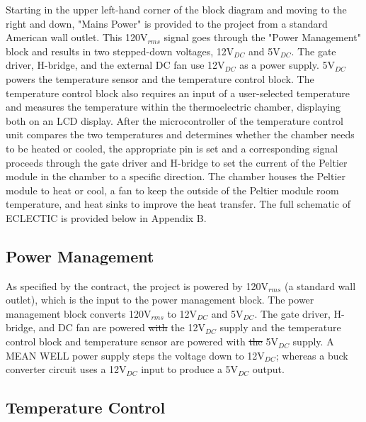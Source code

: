 \documentclass[11pt,letter]{article}
\providecommand{\DIFadd}[1]{{\protect\color{blue}\uwave{#1}}} %
\providecommand{\DIFdel}[1]{{\protect\color{red}\sout{#1}}}                      %
\providecommand{\DIFaddbegin}{} %
\providecommand{\DIFaddend}{} %
\providecommand{\DIFdelbegin}{} %
\providecommand{\DIFdelend}{} %
\newcommand{\DIFscaledelfig}{0.5}
\newlength{\DIFdelgraphicswidth} %
\newlength{\DIFdelgraphicsheight} %
\newcommand{\DIFaddincludegraphics}[2][]{{\color{blue}\fbox{\DIFOincludegraphics[#1]{#2}}}} %
\newcommand{\DIFdelincludegraphics}[2][]{%
\sbox{\DIFdelgraphicsbox}{\DIFOincludegraphics[#1]{#2}}%
\settoboxwidth{\DIFdelgraphicswidth}{\DIFdelgraphicsbox} %
\settoboxtotalheight{\DIFdelgraphicsheight}{\DIFdelgraphicsbox} %
\scalebox{\DIFscaledelfig}{%
\parbox[b]{\DIFdelgraphicswidth}{\usebox{\DIFdelgraphicsbox}\\[-\baselineskip] \rule{\DIFdelgraphicswidth}{0em}}\llap{\resizebox{\DIFdelgraphicswidth}{\DIFdelgraphicsheight}{%
\setlength{\unitlength}{\DIFdelgraphicswidth}%
\begin{picture}(1,1)%
\thicklines\linethickness{2pt} %
{\color[rgb]{1,0,0}\put(0,0){\framebox(1,1){}}}%
{\color[rgb]{1,0,0}\put(0,0){\line( 1,1){1}}}%
{\color[rgb]{1,0,0}\put(0,1){\line(1,-1){1}}}%
\end{picture}%
}\hspace*{3pt}}} %
} %
\DeclareRobustCommand{\DIFaddbegin}{\DIFOaddbegin \let\includegraphics\DIFaddincludegraphics} %
\DeclareRobustCommand{\DIFaddend}{\DIFOaddend \let\includegraphics\DIFOincludegraphics} %
\DeclareRobustCommand{\DIFdelbegin}{\DIFOdelbegin \let\includegraphics\DIFdelincludegraphics} %
\DeclareRobustCommand{\DIFdelend}{\DIFOaddend \let\includegraphics\DIFOincludegraphics} %
\begin{document}
Starting in the upper left-hand corner of the block diagram and moving to the right and down, "Mains Power" is provided to the project from a standard American wall outlet. This 120V$_{rms}$ signal goes through the "Power Management" block and results in two stepped-down voltages, 12V$_{DC}$ and 5V$_{DC}$. The gate driver, H-bridge, and the external DC fan use 12V$_{DC}$ as a power supply. 5V$_{DC}$ powers the temperature sensor and the temperature control block. The temperature control block also requires an input of a user-selected temperature and measures the temperature within the thermoelectric chamber, displaying both on an LCD display. After the microcontroller of the temperature control unit compares the two temperatures and determines whether the chamber needs to be heated or cooled, the appropriate pin is set and a corresponding signal proceeds through the gate driver and H-bridge to set the current of the Peltier module in the chamber to a specific direction. The chamber houses the Peltier module to heat or cool, a fan to keep the outside of the Peltier module room temperature, and heat sinks to improve the heat transfer. The full schematic of ECLECTIC is provided below in Appendix B.

\subsection{Power Management} %

As specified by the contract, the project is powered by 120V$_{rms}$ (a standard wall outlet), which is the input to the power management block. The power management block converts 120V$_{rms}$ to 12V$_{DC}$ and 5V$_{DC}$. The gate driver, H-bridge, and DC fan are powered \DIFdelbegin \DIFdel{with }\DIFdelend \DIFaddbegin \DIFadd{by }\DIFaddend the 12V$_{DC}$ supply and the temperature control block and temperature sensor are powered with \DIFdelbegin \DIFdel{the }\DIFdelend \DIFaddbegin \DIFadd{by }\DIFaddend 5V$_{DC}$ supply. A MEAN WELL power supply steps the voltage down to 12V$_{DC}$; whereas a buck converter circuit uses a 12V$_{DC}$ input to produce a 5V$_{DC}$ output.

\subsection{Temperature Control} %
\end{document}
